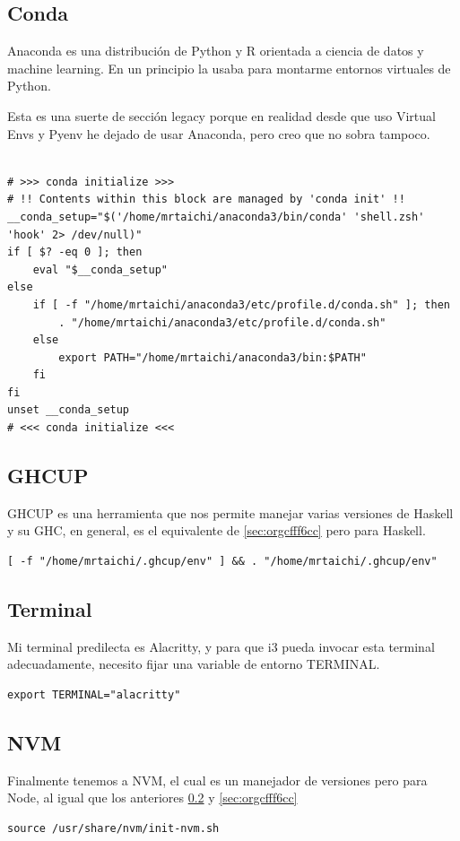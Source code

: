 \documentclass[11pt]{article}
\begin{document}
\subsection{Conda}
\label{sec:org84de109}

Anaconda es una distribución de Python y R orientada a ciencia de datos y machine learning. En un principio la usaba para montarme entornos virtuales de Python.

Esta es una suerte de sección legacy porque en realidad desde que uso Virtual Envs y Pyenv he dejado de usar Anaconda, pero creo que no sobra tampoco.

\begin{verbatim}

# >>> conda initialize >>>
# !! Contents within this block are managed by 'conda init' !!
__conda_setup="$('/home/mrtaichi/anaconda3/bin/conda' 'shell.zsh' 'hook' 2> /dev/null)"
if [ $? -eq 0 ]; then
    eval "$__conda_setup"
else
    if [ -f "/home/mrtaichi/anaconda3/etc/profile.d/conda.sh" ]; then
        . "/home/mrtaichi/anaconda3/etc/profile.d/conda.sh"
    else
        export PATH="/home/mrtaichi/anaconda3/bin:$PATH"
    fi
fi
unset __conda_setup
# <<< conda initialize <<<

\end{verbatim}
\subsection{GHCUP}
\label{sec:orgc9f29ed}

GHCUP es una herramienta que nos permite manejar varias versiones de Haskell y su GHC, en general, es el equivalente de \ref{sec:orgcfff6cc} pero para Haskell.

\begin{verbatim}
[ -f "/home/mrtaichi/.ghcup/env" ] && . "/home/mrtaichi/.ghcup/env"
\end{verbatim}
\subsection{Terminal}
\label{sec:org49d14e9}

Mi terminal predilecta es Alacritty, y para que i3 pueda invocar esta terminal adecuadamente, necesito fijar una variable de entorno TERMINAL.

\begin{verbatim}
export TERMINAL="alacritty"
\end{verbatim}
\subsection{NVM}
\label{sec:org33703c6}

Finalmente tenemos a NVM, el cual es un manejador de versiones pero para Node, al igual que los anteriores \ref{sec:orgc9f29ed}
y \ref{sec:orgcfff6cc}

\begin{verbatim}
source /usr/share/nvm/init-nvm.sh
\end{verbatim}
\end{document}
